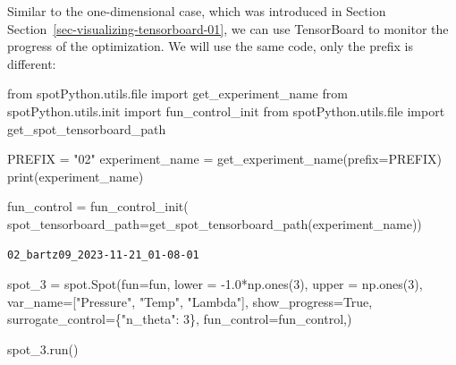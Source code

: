 \documentclass[
  letterpaper,
  DIV=11,
  numbers=noendperiod]{scrreprt}
\newenvironment{Shaded}{\begin{snugshade}}{\end{snugshade}}
\newcommand{\BuiltInTok}[1]{\textcolor[rgb]{0.00,0.23,0.31}{#1}}
\newcommand{\DecValTok}[1]{\textcolor[rgb]{0.68,0.00,0.00}{#1}}
\newcommand{\FloatTok}[1]{\textcolor[rgb]{0.68,0.00,0.00}{#1}}
\newcommand{\ImportTok}[1]{\textcolor[rgb]{0.00,0.46,0.62}{#1}}
\newcommand{\NormalTok}[1]{\textcolor[rgb]{0.00,0.23,0.31}{#1}}
\newcommand{\OperatorTok}[1]{\textcolor[rgb]{0.37,0.37,0.37}{#1}}
\newcommand{\StringTok}[1]{\textcolor[rgb]{0.13,0.47,0.30}{#1}}
\newcommand{\VariableTok}[1]{\textcolor[rgb]{0.07,0.07,0.07}{#1}}
\begin{document}
\begin{tcolorbox}[enhanced jigsaw, left=2mm, toprule=.15mm, colframe=quarto-callout-note-color-frame, leftrule=.75mm, title=\textcolor{quarto-callout-note-color}{\faInfo}\hspace{0.5em}{TensorBoard}, toptitle=1mm, opacitybacktitle=0.6, arc=.35mm, titlerule=0mm, opacityback=0, bottomtitle=1mm, coltitle=black, rightrule=.15mm, colback=white, colbacktitle=quarto-callout-note-color!10!white, breakable, bottomrule=.15mm]

Similar to the one-dimensional case, which was introduced in Section
Section~\ref{sec-visualizing-tensorboard-01}, we can use TensorBoard to
monitor the progress of the optimization. We will use the same code,
only the prefix is different:

\begin{Shaded}
\begin{Highlighting}[]
\ImportTok{from}\NormalTok{ spotPython.utils.}\BuiltInTok{file} \ImportTok{import}\NormalTok{ get\_experiment\_name}
\ImportTok{from}\NormalTok{ spotPython.utils.init }\ImportTok{import}\NormalTok{ fun\_control\_init}
\ImportTok{from}\NormalTok{ spotPython.utils.}\BuiltInTok{file} \ImportTok{import}\NormalTok{ get\_spot\_tensorboard\_path}

\NormalTok{PREFIX }\OperatorTok{=} \StringTok{"02"}
\NormalTok{experiment\_name }\OperatorTok{=}\NormalTok{ get\_experiment\_name(prefix}\OperatorTok{=}\NormalTok{PREFIX)}
\BuiltInTok{print}\NormalTok{(experiment\_name)}

\NormalTok{fun\_control }\OperatorTok{=}\NormalTok{ fun\_control\_init(}
\NormalTok{    spot\_tensorboard\_path}\OperatorTok{=}\NormalTok{get\_spot\_tensorboard\_path(experiment\_name))}
\end{Highlighting}
\end{Shaded}

\begin{verbatim}
02_bartz09_2023-11-21_01-08-01
\end{verbatim}

\end{tcolorbox}

\begin{Shaded}
\begin{Highlighting}[]
\NormalTok{spot\_3 }\OperatorTok{=}\NormalTok{ spot.Spot(fun}\OperatorTok{=}\NormalTok{fun,}
\NormalTok{                   lower }\OperatorTok{=} \OperatorTok{{-}}\FloatTok{1.0}\OperatorTok{*}\NormalTok{np.ones(}\DecValTok{3}\NormalTok{),}
\NormalTok{                   upper }\OperatorTok{=}\NormalTok{ np.ones(}\DecValTok{3}\NormalTok{),}
\NormalTok{                   var\_name}\OperatorTok{=}\NormalTok{[}\StringTok{"Pressure"}\NormalTok{, }\StringTok{"Temp"}\NormalTok{, }\StringTok{"Lambda"}\NormalTok{],}
\NormalTok{                   show\_progress}\OperatorTok{=}\VariableTok{True}\NormalTok{,}
\NormalTok{                   surrogate\_control}\OperatorTok{=}\NormalTok{\{}\StringTok{"n\_theta"}\NormalTok{: }\DecValTok{3}\NormalTok{\},}
\NormalTok{                   fun\_control}\OperatorTok{=}\NormalTok{fun\_control,)}

\NormalTok{spot\_3.run()}
\end{Highlighting}
\end{Shaded}
\end{document}
